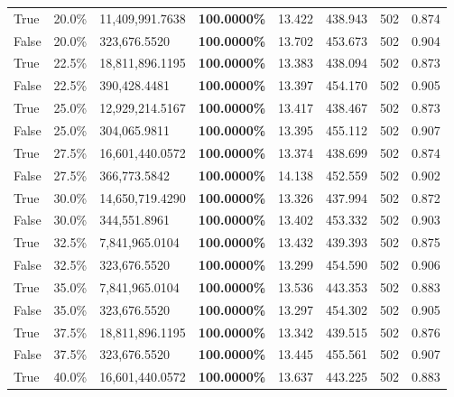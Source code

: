 \begin{table}[H]
\begin{tabular}{lllrllll}
\cline{1-8}
True & 20.0\% & 11,409,991.7638 & \bfseries \color{red} 100.0000\% & 13.422 & 438.943 & 502 & 0.874 \\
\cline{1-8}
False & 20.0\% & 323,676.5520 & \bfseries \color{red} 100.0000\% & 13.702 & 453.673 & 502 & 0.904 \\
\cline{1-8}
True & 22.5\% & 18,811,896.1195 & \bfseries \color{red} 100.0000\% & 13.383 & 438.094 & 502 & 0.873 \\
\cline{1-8}
False & 22.5\% & 390,428.4481 & \bfseries \color{red} 100.0000\% & 13.397 & 454.170 & 502 & 0.905 \\
\cline{1-8}
True & 25.0\% & 12,929,214.5167 & \bfseries \color{red} 100.0000\% & 13.417 & 438.467 & 502 & 0.873 \\
\cline{1-8}
False & 25.0\% & \color{red} 304,065.9811 & \bfseries \color{red} 100.0000\% & 13.395 & 455.112 & 502 & 0.907 \\
\cline{1-8}
True & 27.5\% & 16,601,440.0572 & \bfseries \color{red} 100.0000\% & 13.374 & 438.699 & 502 & 0.874 \\
\cline{1-8}
False & 27.5\% & 366,773.5842 & \bfseries \color{red} 100.0000\% & 14.138 & 452.559 & 502 & 0.902 \\
\cline{1-8}
True & 30.0\% & 14,650,719.4290 & \bfseries \color{red} 100.0000\% & 13.326 & 437.994 & 502 & 0.872 \\
\cline{1-8}
False & 30.0\% & 344,551.8961 & \bfseries \color{red} 100.0000\% & 13.402 & 453.332 & 502 & 0.903 \\
\cline{1-8}
True & 32.5\% & 7,841,965.0104 & \bfseries \color{red} 100.0000\% & 13.432 & 439.393 & 502 & 0.875 \\
\cline{1-8}
False & 32.5\% & 323,676.5520 & \bfseries \color{red} 100.0000\% & 13.299 & 454.590 & 502 & 0.906 \\
\cline{1-8}
True & 35.0\% & 7,841,965.0104 & \bfseries \color{red} 100.0000\% & 13.536 & 443.353 & 502 & 0.883 \\
\cline{1-8}
False & 35.0\% & 323,676.5520 & \bfseries \color{red} 100.0000\% & 13.297 & 454.302 & 502 & 0.905 \\
\cline{1-8}
True & 37.5\% & 18,811,896.1195 & \bfseries \color{red} 100.0000\% & 13.342 & 439.515 & 502 & 0.876 \\
\cline{1-8}
False & 37.5\% & 323,676.5520 & \bfseries \color{red} 100.0000\% & 13.445 & 455.561 & 502 & 0.907 \\
\cline{1-8}
True & 40.0\% & 16,601,440.0572 & \bfseries \color{red} 100.0000\% & 13.637 & 443.225 & 502 & 0.883 \\

\end{tabular}
\end{table}
